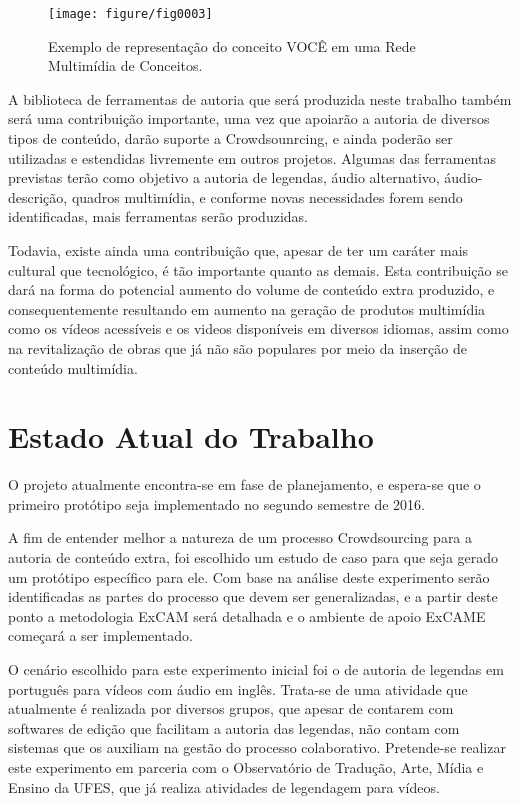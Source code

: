 \documentclass{sig-alternate}
\begin{document}
\begin{figure}[!htb]
\centering
\label{fig0003}
\texttt{[image: figure/fig0003]}
\caption{Exemplo de representação do conceito VOCÊ em uma Rede Multimídia de Conceitos.}
\end{figure}

A biblioteca de ferramentas de autoria que será produzida neste trabalho também será uma contribuição importante, uma vez que apoiarão a autoria de diversos tipos de conteúdo, darão suporte a Crowdsounrcing, e ainda poderão ser utilizadas e estendidas livremente em outros projetos. Algumas das ferramentas previstas terão como objetivo a autoria de legendas, áudio alternativo, áudio-descrição, quadros multimídia, e conforme novas necessidades forem sendo identificadas, mais ferramentas serão produzidas.

Todavia, existe ainda uma contribuição que, apesar de ter um caráter mais cultural que tecnológico, é tão importante quanto as demais. Esta contribuição se dará na forma do potencial aumento do volume de conteúdo extra produzido, e consequentemente resultando em aumento na geração de produtos multimídia como os vídeos acessíveis e os videos disponíveis em diversos idiomas, assim como na revitalização de obras que já não são populares por meio da inserção de conteúdo multimídia.  




\section{Estado Atual do Trabalho}

\par O projeto atualmente encontra-se em fase de planejamento, e espera-se que o primeiro protótipo  seja implementado no segundo semestre de 2016.

A fim de entender melhor a natureza de um processo Crowdsourcing para a autoria de conteúdo extra, foi escolhido um estudo de caso para que seja gerado um protótipo específico para ele. Com base na análise deste experimento serão identificadas as partes do processo que devem ser generalizadas, e a partir deste ponto a metodologia ExCAM será detalhada e o ambiente de apoio ExCAME começará a ser implementado.

O cenário escolhido para este experimento inicial foi o de autoria de legendas em português para vídeos com áudio em inglês. Trata-se de uma atividade que atualmente é realizada por diversos grupos, que apesar de contarem com softwares de edição que facilitam a autoria das legendas, não contam com sistemas que os auxiliam na gestão do processo colaborativo. Pretende-se realizar este experimento em parceria com o Observatório de Tradução, Arte, Mídia e Ensino da UFES, que já realiza atividades de legendagem para vídeos.
\end{document}
